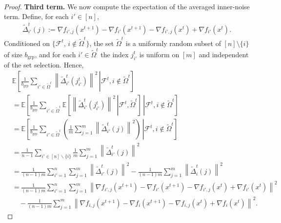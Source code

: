 \documentclass{article}
\newcommand{\sqn}[1]{\left\| #1 \right\|^2}
\newcommand{\eqdef}{:=}
\newcommand{\Expb}[2]{\mathbb{E}\!\left[\left. #1\,\right|#2 \right]}
\theoremstyle{plain}
\begin{document}
\begin{proof}
\textbf{Third term.}
We now compute the expectation of the averaged inner-noise term. Define, for each $i'\in[n]$,
\begin{align*}
\widetilde{\Delta}_{i'}^t(j)\eqdef \nabla f_{i',j}(x^{t+1})-\nabla f_{i'}(x^{t+1})-\nabla f_{i',j}(x^{t})+\nabla f_{i'}(x^{t}).
\end{align*}
Conditioned on $\{\mathcal{F}^t,\, i\notin\tilde{\Omega}^t\}$, the set $\tilde{\Omega}^t$ is a uniformly random subset of $[n]\setminus\{i\}$ of size $b_{\mathrm{grp}}$, and for each $i'\in\tilde{\Omega}^t$ the index $j_{i'}^t$ is uniform on $[m]$ and independent of the set selection. Hence,
\begin{align*}
&\Expb{\frac{1}{b_{\mathrm{grp}}}\sum_{i'\in \tilde{\Omega}^t} \sqn{\widetilde{\Delta}_{i'}^t( j_{i'}^t)}}{\mathcal{F}^t, i\notin\tilde{\Omega}^t} \\
&=\Expb{\frac{1}{b_{\mathrm{grp}}}\sum_{i'\in \tilde{\Omega}^t}\Expb{\sqn{\widetilde{\Delta}_{i'}^t(j_{i'}^t)}}{\mathcal{F}^t,\tilde{\Omega}^t}}{\mathcal{F}^t, i\notin\tilde{\Omega}^t}\\
&=\Expb{\frac{1}{b_{\mathrm{grp}}}\sum_{i'\in \tilde{\Omega}^t}\left(\frac{1}{m}\sum_{j=1}^m \sqn{\widetilde{\Delta}_{i'}^t(j)}\right)}{\mathcal{F}^t, i\notin\tilde{\Omega}^t} \\
&=\frac{1}{n-1}\sum_{i'\in [n]\backslash\{i\}}\frac{1}{m}\sum_{j=1}^m \sqn{\widetilde{\Delta}_{i'}^t(j)}\\
&=\frac{1}{(n-1)m}\sum_{i'=1}^n\sum_{j=1}^m \sqn{\widetilde{\Delta}_{i'}^t(j)}
-\frac{1}{(n-1)m}\sum_{j=1}^m \sqn{\widetilde{\Delta}_{i}^t(j)}\\
&=\frac{1}{(n-1)m}\sum_{i'=1}^n\sum_{j=1}^m
\sqn{\nabla f_{i',j}(x^{t+1})- \nabla f_{i'}(x^{t+1})-\nabla f_{i',j}(x^{t})+\nabla f_{i'}(x^{t})}\\
&\quad-\frac{1}{(n-1)m}\sum_{j=1}^m
\sqn{\nabla f_{i,j}(x^{t+1})- \nabla f_{i}(x^{t+1})-\nabla f_{i,j}(x^{t})+\nabla f_{i}(x^{t})}.
\end{align*}


\end{proof}
\end{document}
